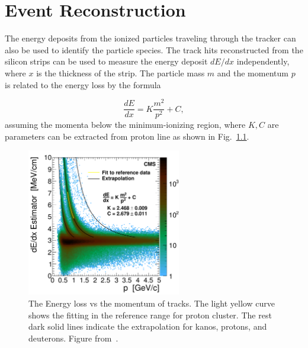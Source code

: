 \chapter{Event Reconstruction}

The energy deposits from the ionized particles traveling through the tracker can also be used to identify the particle species. The track hits reconstructed from the silicon strips can be used to measure the energy deposit $dE/dx$ independently, where $x$ is the thickness of the strip. The particle mass $m$ and the momentum $p$ is related to the energy loss by the formula

\begin{equation}
	\frac{dE}{dx}= K\frac{m^2}{p^2}+C,
\end{equation}
assuming the momenta below the minimum-ionizing region, where $K,C$ are parameters can be extracted from proton line as shown in Fig.~\ref{fig:dedx}.

\begin{figure}[ht]
  \begin{center}
    \includegraphics[width=0.6\textwidth]{figures/reconstruction/dedx.pdf}
  \end{center}
  \caption{The Energy loss vs the momentum of tracks. The light yellow curve shows the fitting in the reference range for proton cluster. The rest dark solid lines indicate the extrapolation for kanos, protons, and deuterons. Figure from~\cite{Khachatryan:2010pw}.}
  \label{fig:dedx}
\end{figure}
